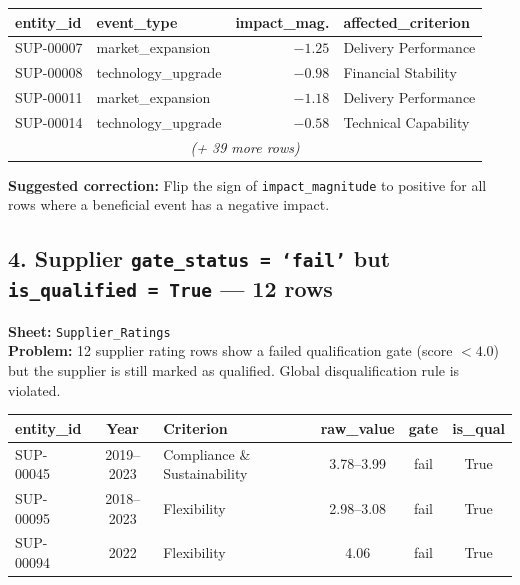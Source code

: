 \documentclass[11pt]{article}
\begin{document}
\begin{center}
\begin{tabular}{llrl}
\toprule
\textbf{entity\_id} & \textbf{event\_type} & \textbf{impact\_mag.} & \textbf{affected\_criterion} \\
\midrule
SUP-00007 & market\_expansion & \textcolor{critred}{$-1.25$} & Delivery Performance \\
SUP-00008 & technology\_upgrade & \textcolor{critred}{$-0.98$} & Financial Stability \\
SUP-00011 & market\_expansion & \textcolor{critred}{$-1.18$} & Delivery Performance \\
SUP-00014 & technology\_upgrade & \textcolor{critred}{$-0.58$} & Technical Capability \\
\multicolumn{4}{c}{\emph{(+ 39 more rows)}} \\
\bottomrule
\end{tabular}
\end{center}

\noindent\textbf{Suggested correction:} Flip the sign of \texttt{impact\_magnitude} to positive for all rows where a beneficial event has a negative impact.

\bigskip

\subsection*{4. Supplier \texttt{gate\_status = `fail'} but \texttt{is\_qualified = True} --- 12 rows}
\textbf{Sheet:} \texttt{Supplier\_Ratings}\\
\textbf{Problem:} 12 supplier rating rows show a failed qualification gate (score $< 4.0$) but the supplier is still marked as qualified. Global disqualification rule is violated.

\begin{center}
\begin{tabular}{lclccc}
\toprule
\textbf{entity\_id} & \textbf{Year} & \textbf{Criterion} & \textbf{raw\_value} & \textbf{gate} & \textbf{is\_qual} \\
\midrule
SUP-00045 & 2019--2023 & Compliance \& Sustainability & 3.78--3.99 & fail & \textcolor{critred}{True} \\
SUP-00095 & 2018--2023 & Flexibility & 2.98--3.08 & fail & \textcolor{critred}{True} \\
SUP-00094 & 2022 & Flexibility & 4.06 & fail & \textcolor{critred}{True} \\
\bottomrule
\end{tabular}
\end{center}
\end{document}
